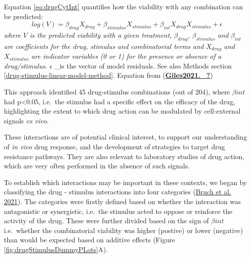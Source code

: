 \documentclass[11pt, a4paper, twosided]{book}
\begin{document}
Equation \eqref{eq:drugCytInt} quantifies how the viability with any combination can be predicted:
\begin{equation}
            log(V) = \beta_{drug}X_{drug} + \beta_{stimulus}X_{stimulus} + \beta_{int}X_{drug}X_{stimulus} + \epsilon
                                       \label{eq:drugCytInt}
    \end{equation}
\emph{where \(V\) is the predicted viability with a given treatment,} \(\beta_{drug}\), \(\beta_{stimulus}\) \emph{and} \(\beta_{int}\) \emph{are coefficients for the drug, stimulus and combinatorial terms and} \(X_{drug}\) \emph{and} \(X_{stimulus}\) \emph{are indicator variables (0 or 1) for the presence or absence of a drug/stimulus.} \(\epsilon\) \_is the vector of model residuals. See also Methods section \ref{drug-stimulus-linear-model-method}. Equation from (\protect\hyperlink{ref-Giles2021._}{\textbf{Giles2021.\_?}})

This approach identified 45 drug-stimulus combinations (out of 204), where \(\beta{int}\) had p\textless0.05, i.e.~the stimulus had a specific effect on the efficacy of the drug, highlighting the extent to which drug action can be modulated by cell-external signals \emph{ex vivo}.

These interactions are of potential clinical interest, to support our understanding of \emph{in vivo} drug response, and the development of strategies to target drug resistance pathways. They are also relevant to laboratory studies of drug action, which are very often performed in the absence of such signals.

To establish which interactions may be important in these contexts, we began by classifying the drug - stimulus interactions into four categories (\protect\hyperlink{ref-Giles2021}{Bruch et al. 2021}). The categories were firstly defined based on whether the interaction was antagonistic or synergistic, i.e.~the stimulus acted to oppose or reinforce the activity of the drug. These were further divided based on the sign of \(\beta{int}\) i.e.~whether the combinatorial viability was higher (postive) or lower (negative) than would be expected based on additive effects (Figure \ref{fig:drugStimulusDummyPLots}A).
\end{document}
